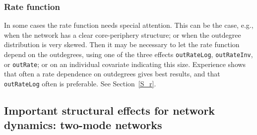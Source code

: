 \documentclass[a4paper,fleqn,11pt]{article}
\newcommand{\+}{\, + \,}
\begin{document}
\subsubsection{Rate function}

In some cases the rate function needs special attention.
This can be the case, e.g., when the network has a clear
core-periphery structure; or when the outdegree distribution
is very skewed.
Then it may be necessary to let the rate function
depend on the outdegrees, using one of the three effects \texttt{outRateLog},
\texttt{outRateInv}, or \texttt{outRate};
or on an individual covariate indicating this size.
Experience shows that often a rate dependence on outdegrees gives
best results, and that \texttt{outRateLog} often is preferable.
See Section~\ref{S_r}.


\subsection{Important structural effects for network dynamics: \protect\newline
            two-mode networks}
\label{S_imp_str2}
\end{document}
